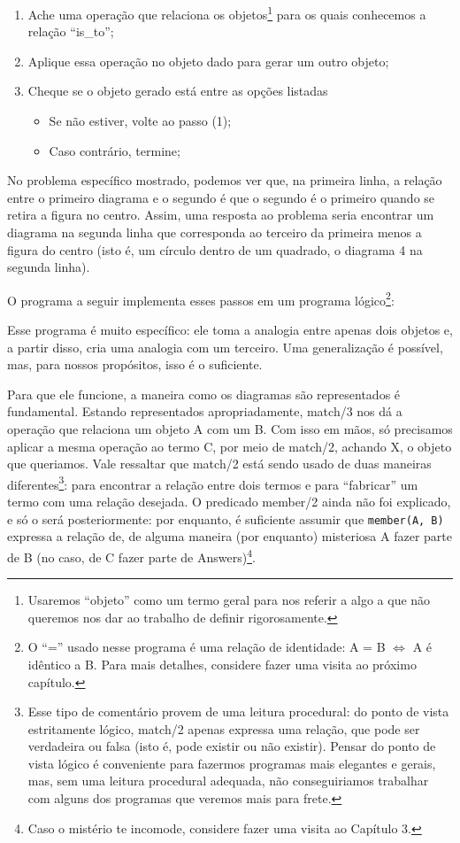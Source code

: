 \documentclass{article}
\theoremstyle{remark}
\theoremstyle{theorem}
\begin{document}
\begin{enumerate}
  \item Ache uma operação que relaciona os objetos\footnote{Usaremos ``objeto'' como um termo geral para nos referir a algo a que não queremos nos dar ao trabalho de definir rigorosamente.} para os quais conhecemos a relação ``is\_to'';
  \item Aplique essa operação no objeto dado para gerar um outro objeto;
  \item Cheque se o objeto gerado está entre as opções listadas
    \begin{itemize}
      \item Se não estiver, volte ao passo (1);
      \item Caso contrário, termine;
    \end{itemize}
\end{enumerate}

No problema específico mostrado, podemos ver que, na primeira linha, a relação entre o primeiro diagrama e o segundo é que o segundo é o primeiro quando se retira a figura no centro. Assim, uma resposta ao problema seria encontrar um diagrama na segunda linha que corresponda ao terceiro da primeira menos a figura do centro (isto é, um círculo dentro de um quadrado, o diagrama 4 na segunda linha).

O programa a seguir implementa esses passos em um programa lógico\footnote{O ``='' usado nesse programa é uma relação de identidade: A = B $\Leftrightarrow$ A é idêntico a B. Para mais detalhes, considere fazer uma visita ao próximo capítulo.}:



Esse programa é muito específico: ele toma a analogia entre apenas dois objetos e, a partir disso, cria uma analogia com um terceiro. Uma generalização é possível, mas, para nossos propósitos, isso é o suficiente.

Para que ele funcione, a maneira como os diagramas são representados é fundamental. Estando representados apropriadamente, match/3 nos dá a operação que relaciona um objeto A com um B. Com isso em mãos, só precisamos aplicar a mesma operação ao termo C, por meio de match/2, achando X, o objeto que queriamos. Vale ressaltar que match/2 está sendo usado de duas maneiras diferentes\footnote{Esse tipo de comentário provem de uma leitura procedural: do ponto de
  vista estritamente lógico, match/2 apenas expressa uma relação, que pode ser verdadeira ou falsa (isto é, pode existir ou não existir). Pensar do ponto de vista lógico é conveniente para fazermos programas mais elegantes e gerais, mas, sem uma leitura procedural adequada, não conseguiriamos trabalhar com alguns dos programas que veremos mais para frete.}: para encontrar a relação entre dois termos e para ``fabricar'' um termo com uma relação
desejada. O predicado member/2 ainda não foi explicado, e só o será posteriormente: por enquanto, é suficiente assumir que {\tt member(A, B)} expressa a relação de, de alguma maneira (por enquanto) misteriosa A fazer parte de B (no caso, de C fazer parte de Answers)\footnote{Caso o mistério te incomode, considere fazer uma visita ao Capítulo 3.}.
\end{document}
